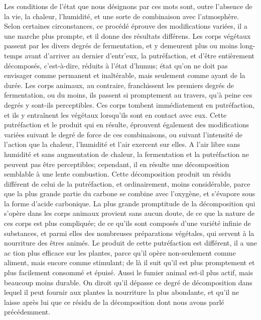 Les conditions de l'état que nous désignons par ces mots sont, outre l'absence de la vie, la chaleur, l'humidité, et une sorte de combinaison avec l'atmosphère. Selon certaines circonstances, ce procédé éprouve des modifications variées, il a une marche plus prompte, et il donne des résultats différens.
Les corps végétaux passent par les divers degrés de fermentation, et y demeurent plus ou moins long-temps avant d'arriver au dernier d'entr'eux, la putréfaction, et d'être entièrement décomposés, c'est-à-dire, réduits à l'état d'humus; état qu'on ne doit pas envisager comme permanent et inaltérable, mais seulement comme ayant de la durée.
Les corps animaux, au contraire, franchissent les premiers degrés de fermentation, ou du moins, ils passent si promptement au\setcounter{page}{229} travers, qu'à peine ces degrés y sont-ils perceptibles. Ces corps tombent immédiatement en putréfaction, et ils y entraînent les végétaux lorsqu'ils sont en contact avec eux. Cette putréfaction et le produit qui en résulte, éprouvent également des modifications variées suivant le degré de force de ces combinaisons, ou suivant l'intensité de l'action que la chaleur, l'humidité et l'air exercent sur elles.
A l'air libre sans humidité et sans augmentation de chaleur, la fermentation et la putréfaction ne peuvent pas être perceptibles; cependant, il en résulte une décomposition semblable à une lente combustion. Cette décomposition produit un résidu différent de celui de la putréfaction, et ordinairement, moins considérable, parce que la plus grande partie du carbone se combine avec l'oxygène, et s'évapore sous la forme d'acide carbonique.
La plus grande promptitude de la décomposition qui s'opère dans les corps animaux provient sans aucun doute, de ce que la nature de ces corps est plus compliquée; de ce qu'ils sont composés d'une variété infinie de substances, et parmi elles des nombreuses préparations végétales, qui servent à la nourriture des êtres animés. Le produit de cette putréfaction est différent, il a une ac\setcounter{page}{230} tion plus efficace sur les plantes, parce qu'il opère non-seulement comme aliment, mais encore comme stimulant; de là il suit qu'il est plus promptement et plus facilement consommé et épuisé. Aussi le fumier animal est-il plus actif, mais beaucoup moins durable. On diroit qu'il dépasse ce degré de décomposition dans lequel il peut fournir aux plantes la nourriture la plus abondante, et qu'il ne laisse après lui que ce résidu de la décomposition dont nous avons parlé précédemment.
